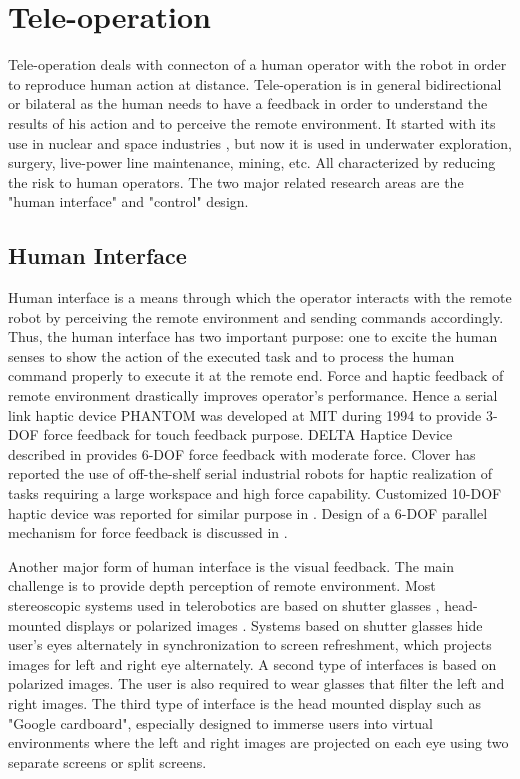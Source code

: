    
\section{Tele-operation}
Tele-operation deals with  connecton of a   human operator with the robot in order to reproduce human action at distance. Tele-operation is in general bidirectional or bilateral as the human needs to have a feedback in order to understand the results of his action and to perceive the remote environment. It started with its use in nuclear and space industries \cite{martin1985teleoperated,vertut1986teleoperations}, but now it is used in underwater exploration, surgery, live-power line maintenance, mining, etc. All characterized by reducing the risk to human operators. The two major related research areas are the "human interface" and "control" design.
\subsection{Human Interface}

Human interface is a means through which the operator interacts with the remote robot by perceiving the remote environment and sending commands accordingly. Thus, the human interface has two important purpose: one to excite the human senses to show the action of the executed task and to process the human command properly to execute it at the remote end.  Force and haptic feedback of remote environment drastically improves operator's performance. Hence a serial link haptic device PHANTOM \cite{massie1994phantom} was developed at MIT during 1994 to provide 3-DOF force feedback  for touch feedback purpose. DELTA Haptice Device described in \cite{grange2001overview} provides 6-DOF force feedback with moderate force. Clover \cite{clover1997dynamic} has reported  the use of off-the-shelf serial industrial robots for haptic realization of tasks requiring a large workspace and high force capability. Customized 10-DOF  haptic device was reported  for similar purpose in \cite{ueberle2004vishard10}. Design  of a 6-DOF parallel mechanism for force feedback is discussed in \cite{yoon2001design}.

Another major form of human interface is the visual feedback. The main challenge is to provide depth perception of remote environment. Most stereoscopic systems used in telerobotics are based on shutter glasses \cite{aracil1997telerobotic,matthies1992stereo}, head-mounted displays \cite{matthies1992stereo} or polarized images \cite{hirzinger1994robots}. Systems based on shutter glasses hide user's eyes alternately in synchronization to screen refreshment, which projects images for left and right eye alternately. A second type of interfaces is based on polarized images. The user is also required to wear glasses that filter the left and right images. The third type of interface is  the head mounted display such as "Google cardboard",  especially designed to immerse users into virtual environments where the left and right images are projected on each eye using two separate screens or split screens.


